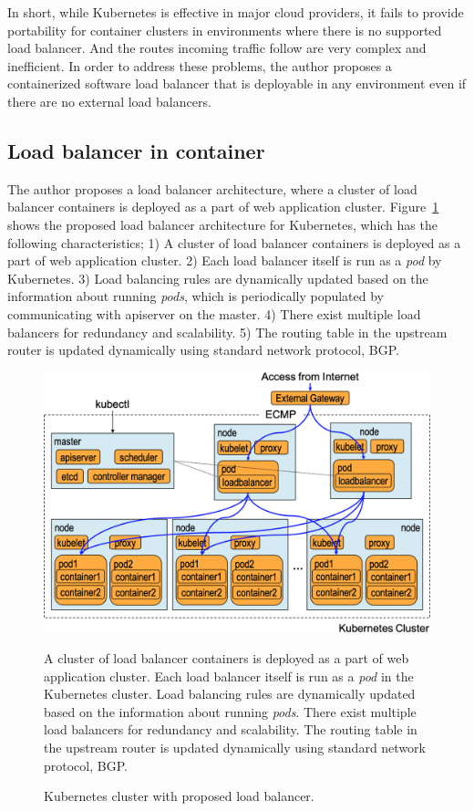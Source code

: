 In short, while Kubernetes is effective in major cloud providers, it fails to provide portability for container clusters in environments where there is no supported load balancer. 
And the routes incoming traffic follow are very complex and inefficient.
In order to address these problems, the author proposes a containerized software load balancer 
that is deployable in any environment even if there are no external load balancers.

\FloatBarrier

\subsection{Load balancer in container}\label{Load balancer in container}

The author proposes a load balancer architecture, where a cluster of load balancer containers is deployed as a part of web application cluster.
Figure~\ref{fig:K8sProposed} shows the proposed load balancer architecture for Kubernetes,
which has the following characteristics;
1) A cluster of load balancer containers is deployed as a part of web application cluster.
2) Each load balancer itself is run as a {\em pod} by Kubernetes.
3) Load balancing rules are dynamically updated based on the information about running {\em pods}, which is periodically populated by communicating with apiserver on the master.
4) There exist multiple load balancers for redundancy and scalability.
5) The routing table in the upstream router is updated dynamically using standard network protocol, BGP.

\begin{figure}[h]
  \begin{center}
  \includegraphics[width=0.8\columnwidth]{Figs/K8sProposed}
  \caption{Kubernetes cluster with proposed load balancer.}
  \label{fig:K8sProposed}
  \begin{minipage}{0.9\columnwidth}
  A cluster of load balancer containers is deployed as a part of web application cluster.
  Each load balancer itself is run as a {\em pod} in the Kubernetes cluster. 
  Load balancing rules are dynamically updated based on the information about running {\em pods}.
  There exist multiple load balancers for redundancy and scalability.
  The routing table in the upstream router is updated dynamically using standard network protocol, BGP.
  \end{minipage}
  \end{center}
\end{figure}

